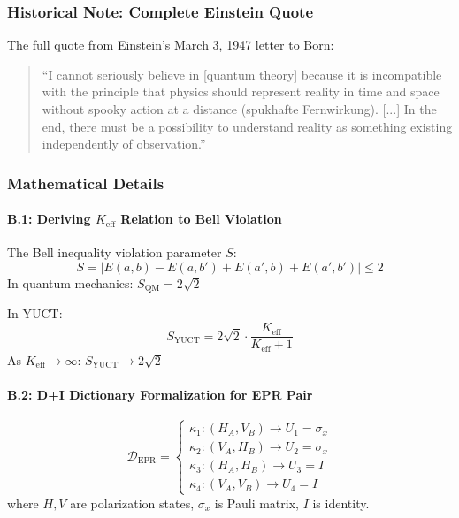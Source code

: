 \documentclass[11pt,a4paper]{article}
\begin{document}
	\subsubsection*{Historical Note: Complete Einstein Quote}
	The full quote from Einstein's March 3, 1947 letter to Born:
	
	\begin{quote}
		``I cannot seriously believe in [quantum theory] because it is incompatible with the principle that physics should represent reality in time and space without spooky action at a distance (spukhafte Fernwirkung). [...] In the end, there must be a possibility to understand reality as something existing independently of observation.''
	\end{quote}
	
	\subsubsection*{Mathematical Details}
	
	\paragraph{B.1: Deriving $K_{\mathrm{eff}}$ Relation to Bell Violation}
	The Bell inequality violation parameter $S$:
	\begin{equation}
		S = |E(a,b) - E(a,b') + E(a',b) + E(a',b')| \leq 2
	\end{equation}
	In quantum mechanics: $S_{\text{QM}} = 2\sqrt{2}$
	
	In YUCT:
	\begin{equation}
		S_{\text{YUCT}} = 2\sqrt{2} \cdot \frac{K_{\mathrm{eff}}}{K_{\mathrm{eff}} + 1}
	\end{equation}
As $K_{\mathrm{eff}} \to \infty$: $S_{\text{YUCT}} \to 2\sqrt{2}$
\paragraph{B.2: \protect\mbox{D+I} Dictionary Formalization for EPR Pair}
	\begin{equation}
		\mathcal{D}_{\text{EPR}} = 
		\begin{cases}
			\kappa_1: (H_A, V_B) \to U_1 = \sigma_x \\
			\kappa_2: (V_A, H_B) \to U_2 = \sigma_x \\
			\kappa_3: (H_A, H_B) \to U_3 = I \\
			\kappa_4: (V_A, V_B) \to U_4 = I
		\end{cases}
	\end{equation}
	where $H,V$ are polarization states, $\sigma_x$ is Pauli matrix, $I$ is identity.
	
\end{document}
